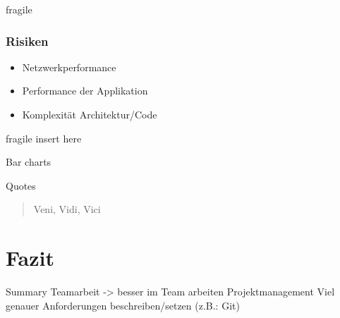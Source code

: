 \documentclass[10pt, compress]{beamer}
\begin{document}
\begin{frame}{fragile}
	\frametitle{Risiken}
	\begin{itemize}
	\item Netzwerkperformance
	\item Performance der Applikation
	\item Komplexität Architektur/Code
	\end{itemize}
\end{frame}


\begin{frame}{fragile}
    insert here
\end{frame}


\begin{frame}{Bar charts}
  
\end{frame}
\begin{frame}{Quotes}
  \begin{quote}
    Veni, Vidi, Vici
  \end{quote}
\end{frame}

\section{Fazit}
\begin{frame}{Summary}
Teamarbeit -> besser im Team arbeiten
Projektmanagement
Viel genauer Anforderungen beschreiben/setzen (z.B.: Git)

\end{frame}

\end{document}
